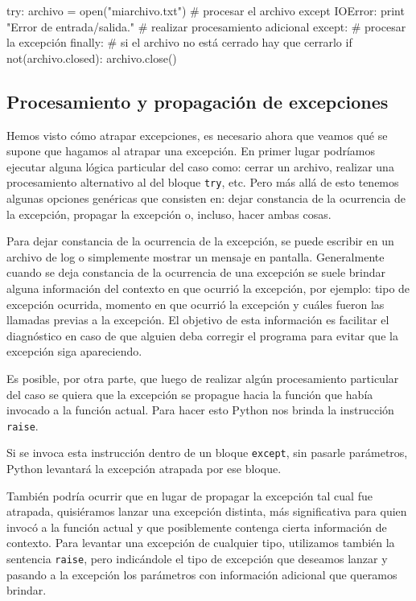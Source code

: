 \begin{codigo-python-sn}
try:
	archivo = open("miarchivo.txt")
	# procesar el archivo
except IOError:
	print "Error de entrada/salida."
	# realizar procesamiento adicional
except:
	# procesar la excepción
finally:
	# si el archivo no está cerrado hay que cerrarlo
	if not(archivo.closed):
		archivo.close()
\end{codigo-python-sn}

\subsection{Procesamiento y propagación de excepciones}

Hemos visto cómo atrapar excepciones, es necesario ahora que veamos qué se
supone que hagamos al atrapar una excepción. En primer lugar podríamos
ejecutar alguna lógica particular del caso como: cerrar un archivo,
realizar una procesamiento alternativo al del bloque \lstinline!try!, etc.
Pero más allá de esto tenemos algunas opciones genéricas que consisten en:
dejar constancia de la ocurrencia de la excepción, propagar la excepción o,
incluso, hacer ambas cosas.

Para dejar constancia de la ocurrencia de la excepción, se puede escribir
en un archivo de log o simplemente mostrar un mensaje en pantalla.
Generalmente cuando se deja constancia de la ocurrencia de una excepción se
suele brindar alguna información del contexto en que ocurrió la excepción,
por ejemplo: tipo de excepción ocurrida, momento en que ocurrió la
excepción y cuáles fueron las llamadas previas a la excepción. El objetivo
de esta información es facilitar el diagnóstico en caso de que alguien deba
corregir el programa para evitar que la excepción siga apareciendo.

Es posible, por otra parte, que luego de realizar algún procesamiento
particular del caso se quiera que la excepción se propague hacia la función
que había invocado a la función actual. Para hacer esto Python nos brinda
la instrucción \lstinline!raise!.

Si se invoca esta instrucción dentro de un bloque \lstinline!except!, sin
pasarle parámetros, Python levantará la excepción atrapada por ese bloque.

También podría ocurrir que en lugar de propagar la excepción tal cual fue
atrapada, quisiéramos lanzar una excepción distinta, más significativa para
quien invocó a la función actual y que posiblemente contenga cierta
información de contexto. Para levantar una excepción de cualquier tipo,
utilizamos también la sentencia \lstinline!raise!, pero indicándole el tipo
de excepción que deseamos lanzar y pasando a la excepción los parámetros
con información adicional que queramos brindar. 

